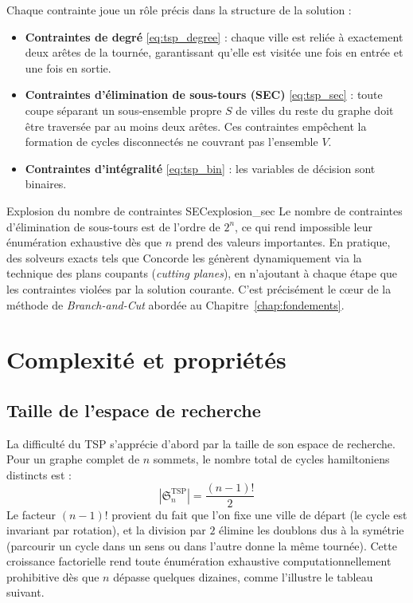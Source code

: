 \documentclass[12pt, a4paper, twoside, openright]{book}
\begin{document}
	Chaque contrainte joue un rôle précis dans la structure de la solution :
	
	\begin{itemize}
		\item \textbf{Contraintes de degré} \eqref{eq:tsp_degree} : chaque ville
		est reliée à exactement deux arêtes de la tournée, garantissant
		qu'elle est visitée une fois en entrée et une fois en sortie.
		
		\item \textbf{Contraintes d'élimination de sous-tours (SEC)} 
		\eqref{eq:tsp_sec} : toute coupe séparant un sous-ensemble propre
		$S$ de villes du reste du graphe doit être traversée par au moins
		deux arêtes. Ces contraintes empêchent la formation de cycles
		disconnectés ne couvrant pas l'ensemble $V$.
		
		\item \textbf{Contraintes d'intégralité} \eqref{eq:tsp_bin} : les
		variables de décision sont binaires.
	\end{itemize}
	
	\begin{remark}{Explosion du nombre de contraintes SEC}{explosion_sec}
Le nombre de contraintes d'élimination de sous-tours est de l'ordre de $2^n$, ce qui rend impossible leur énumération exhaustive dès que $n$ prend des valeurs importantes. En pratique, des solveurs exacts tels que Concorde les génèrent dynamiquement via la technique des plans coupants (\textit{cutting planes}), en n'ajoutant à chaque étape que les contraintes violées par la solution courante. C'est précisément le c\oe{}ur de la méthode de \textit{Branch-and-Cut} abordée au Chapitre~\ref{chap:fondements}.
	\end{remark}
	
	
	
	\section{Complexit\'e et propri\'et\'es}
	\label{sec:tsp_complexite}
	
	\subsection{Taille de l'espace de recherche}
	\label{subsec:tsp_espace}
	
	La difficulté du TSP s'apprécie d'abord par la taille de son espace de
	recherche. Pour un graphe complet de $n$ sommets, le nombre total de cycles
	hamiltoniens distincts est :
	$$
	|\mathfrak{S}_n^{\text{TSP}}| = \frac{(n-1)!}{2}
	$$
	Le facteur $(n-1)!$ provient du fait que l'on fixe une ville de départ
	(le cycle est invariant par rotation), et la division par $2$ élimine les
	doublons dus à la symétrie (parcourir un cycle dans un sens ou dans l'autre
	donne la même tournée). Cette croissance factorielle rend toute énumération
	exhaustive computationnellement prohibitive dès que $n$ dépasse quelques
	dizaines, comme l'illustre le tableau suivant.
	
\end{document}
